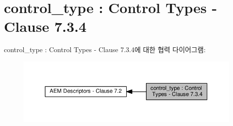 \hypertarget{group__control__type}{}\section{control\+\_\+type \+: Control Types -\/ Clause 7.3.4}
\label{group__control__type}
control\+\_\+type \+: Control Types -\/ Clause 7.3.4에 대한 협력 다이어그램\+:
\nopagebreak
\begin{figure}[H]
\begin{center}
\leavevmode
\includegraphics[width=350pt]{group__control__type}
\end{center}
\end{figure}
